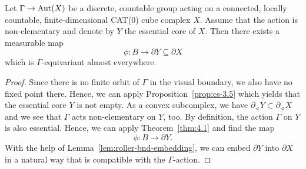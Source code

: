 \begin{cor}
  \label{cor:4.2}
  Let \(\Gamma \to \operatorname{Aut}(X)\) be a discrete, countable group acting on a connected, locally countable, finite-dimensional CAT(0) cube complex \(X\). Assume that the action is non-elementary and denote by \(Y\) the essential core of \(X\). Then there exists a measurable map
  \[
    \phi \colon B \to \partial Y \subseteq \partial X
  \]
  which is \(\Gamma\)-equivariant almost everywhere.
\end{cor}

\begin{proof}
  Since there is no finite orbit of \(\Gamma\) in the visual boundary, we also have no fixed point there. Hence, we can apply Proposition~\ref{prop:cs-3.5} which yields that the essential core \(Y\) is not empty. As a convex subcomplex, we have \(\partial_\sphericalangle Y \subset \partial_\sphericalangle X\) and we see that \(\Gamma\) acts non-elementary on \(Y\), too. By definition, the action \(\Gamma\) on \(Y\) is also essential. Hence, we can apply Theorem~\ref{thm:4.1} and find the map
  \[
    \phi\colon B \to \partial Y.
  \]
  With the help of Lemma~\ref{lem:roller-bnd-embedding}, we can embed \(\partial Y\) into \(\partial X\) in a natural way that is compatible with the \(\Gamma\)-action.
\end{proof}

